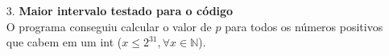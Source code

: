 \documentclass[12pt, a4paper]{article} %
\begin{document}
\begin{enumerate}
\begin{itemize}
\end{itemize}
\large
\item[3.]\textbf{Maior intervalo testado para o código}
\normalsize\\
O programa conseguiu calcular o valor de $p$ para todos os números positivos que cabem em um int ($x \leqslant 2^{31}, \forall x \in \mathbb{N}$).
\end{enumerate}
\end{document}
